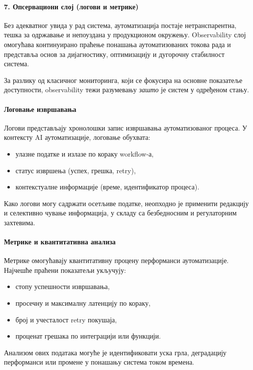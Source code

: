 \paragraph*{7. Опсервациони слој (логови и метрике)}

Без адекватног увида у рад система, аутоматизација постаје нетранспарентна,
тешка за одржавање и непоуздана у продукционом окружењу.
Observability слој омогућава континуирано праћење понашања аутоматизованих токова рада
и представља основ за дијагностику, оптимизацију и дугорочну стабилност система.

За разлику од класичног мониторинга, који се фокусира на основне показатеље доступности,
observability тежи разумевању \textit{зашто} је систем у одређеном стању.

\paragraph{Логовање извршавања}

Логови представљају хронолошки запис извршавања аутоматизованог процеса.
У контексту AI аутоматизације, логовање обухвата:
\begin{itemize}
    \item улазне податке и излазе по кораку workflow-а,
    \item статус извршења (успех, грешка, retry),
    \item контекстуалне информације (време, идентификатор процеса).
\end{itemize}
\noindent
Како логови могу садржати осетљиве податке, неопходно је применити редакцију и селективно
чување информација, у складу са безбедносним и регулаторним захтевима.

\paragraph{Метрике и квантитативна анализа}

Метрике омогућавају квантитативну процену перформанси аутоматизације.
Најчешће праћени показатељи укључују:
\begin{itemize}
    \item стопу успешности извршавања,
    \item просечну и максималну латенцију по кораку,
    \item број и учесталост retry покушаја,
    \item проценат грешака по интеграцији или функцији.
\end{itemize}
\noindent
Анализом ових података могуће је идентификовати уска грла, деградацију перформанси
или промене у понашању система током времена.

